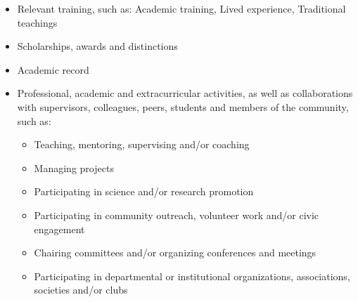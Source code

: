 \documentclass{article}
\begin{document}
\begin{itemize}
    \item Relevant training, such as: Academic training, Lived experience, Traditional teachings

    \item Scholarships, awards and distinctions

    \item Academic record

    \item Professional, academic and extracurricular activities, as well as collaborations with supervisors, colleagues, peers, students and members of the community, such as:
    \begin{itemize}
        \item Teaching, mentoring, supervising and/or coaching
        \item Managing projects
        \item Participating in science and/or research promotion
        \item Participating in community outreach, volunteer work and/or civic engagement
        \item Chairing committees and/or organizing conferences and meetings
        \item Participating in departmental or institutional organizations, associations, societies and/or clubs
    \end{itemize}
\end{itemize}


%
\end{document}
